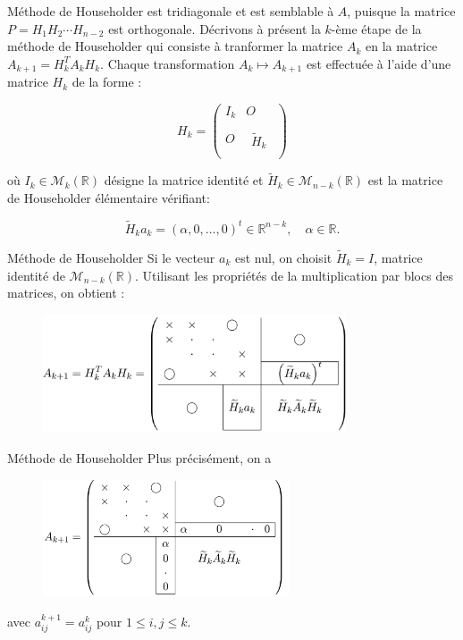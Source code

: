 \documentclass[french, 10pt]{beamer}
\theoremstyle{definition}
\begin{document}
\begin{frame}{Méthode de Householder}
	est tridiagonale et est semblable à $A$, puisque la matrice $P=H_1 H_2 \cdots H_{n-2}$ est orthogonale.
	Décrivons à présent la $k$-ème étape de la méthode de Householder qui consiste à tranformer la matrice $A_k$ en la matrice $A_{k+1}=H_k^T A_k H_k$. Chaque transformation $A_k \mapsto A_{k+1}$ est effectuée à l'aide d'une matrice $H_k$ de la forme :
	
	$$
	H_k=\left(\begin{array}{c|c}
		I_k & O \\
		\hline O & \begin{array}{c} \quad \\ \widetilde{H}_k \\ \quad \end{array}
	\end{array}\right)
	$$
	
	où $I_k \in \mathcal{M}_k(\mathbb{R})$ désigne la matrice identité et $\widetilde{H}_k \in \mathcal{M}_{n-k}(\mathbb{R})$ est la matrice de Householder élémentaire vérifiant:
	
	$$
	\widetilde{H}_k a_k=(\alpha, 0, \ldots, 0)^t \in \mathbb{R}^{n-k}, \quad \alpha \in \mathbb{R} .
	$$
\end{frame}
\begin{frame}{Méthode de Householder}
	Si le vecteur $a_k$ est nul, on choisit $\tilde{H}_k=I$, matrice identité de $\mathcal{M}_{n-k}(\mathbb{R})$. Utilisant les propriétés de la multiplication par blocs des matrices, on obtient :
	
	\begin{figure}[h]
		\centering
		\includegraphics[width=0.8\textwidth]{pictures/two.png}  %
		\label{fig:image1}
	\end{figure}
	
\end{frame}
\begin{frame}{Méthode de Householder}
	Plus précisément, on a
	
	\begin{figure}[h]
		\centering
		\includegraphics[width=0.65\textwidth]{pictures/three.png}  %
		\label{fig:image1}
	\end{figure}
	
	
	avec $a_{i j}^{k+1}=a_{i j}^k$ pour $1 \leq i, j \leq k$.
\end{frame}
\end{document}
